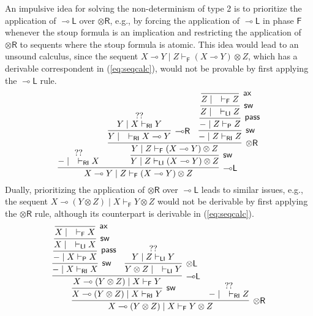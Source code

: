 \documentclass[copyright,creativecommons]{eptcs}
\theoremstyle{definition}
\newcommand{\tl}{\otimes \mathsf{L}}
\newcommand{\tr}{\otimes \mathsf{R}}
\newcommand{\lright}{{\multimap}\mathsf{R}}
\newcommand{\lleft}{{\multimap}\mathsf{L}}
\newcommand{\pass}{\mathsf{pass}}
\newcommand{\ax}{\mathsf{ax}}
\newcommand{\ot}{\otimes}
\newcommand{\lolli}{\multimap}
\newcommand{\RI}{\mathsf{RI}}
\newcommand{\LI}{\mathsf{LI}}
\newcommand{\Pass}{\mathsf{P}}
\newcommand{\F}{\mathsf{F}}
\newcommand{\NMILL}{\texttt{NMILL}}
\newcommand{\SkNMILL}{\NMILL\textsuperscript{\textit{s}}}
\begin{document}
An impulsive idea for solving the non-determinism of type 2 is to prioritize the application of $\lleft$ over $\tr$, e.g., by forcing the application of $\lleft$ in phase $\F$ whenever the stoup formula is an implication and restricting the application of $\tr$ to sequents where the stoup formula is atomic. This idea would lead to an unsound calculus, since the sequent $X \lolli Y \mid Z \vdash_{\F} (X \lolli Y) \ot Z$, which has a derivable correspondent in (\ref{eq:seqcalc}), would not be provable by first applying the $\lleft$ rule.
\begin{equation*}\label{eq:counterexample1}
   \infer[\lleft]{X \lolli Y \mid Z \vdash_{\F} (X \lolli Y) \ot Z}{
     \deduce{{-} \mid \quad \vdash_{\RI} X}{??}
     &
     \infer[\mathsf{sw}]{Y \mid Z \vdash_{\LI} (X \lolli Y) \ot Z}{
       \infer[\tr]{Y \mid Z \vdash_{\F} (X \lolli Y) \ot Z}{
         \infer[\lright]{Y \mid \quad \vdash_{\RI} X \lolli Y}{
           \deduce{Y \mid X \vdash_{\RI} Y}{??}
         }
         &
         \infer[\mathsf{sw}]{{-} \mid Z \vdash_{\RI} Z}{
           \infer[\pass]{{-} \mid Z \vdash_{\Pass} Z}{
             \infer[\mathsf{sw}]{Z \mid \quad \vdash_{\LI} Z}{
               \infer[\ax]{Z \mid \quad \vdash_{\F} Z}{}
             }
           }
         }
       }
     }
   }
\end{equation*}
Dually, prioritizing the application of $\tr$ over $\lleft$ leads to similar issues, e.g., the sequent $X \lolli (Y \ot Z) \mid X \vdash_\F Y \ot Z$ would not be derivable by first applying the $\tr$ rule, although its counterpart is derivable in  (\ref{eq:seqcalc}).
\begin{equation*}\label{eq:counterexample2}
\infer[\tr]{X \lolli (Y \ot Z) \mid X \vdash_{\F} Y \ot Z}{
  \infer[\mathsf{sw}]{X \lolli (Y \ot Z) \mid X \vdash_{\RI} Y}{
    \infer[\lleft]{X \lolli (Y \ot Z) \mid X \vdash_{\F} Y}{
      \infer[\mathsf{sw}]{{-}  \mid X \vdash_{\RI} X}{
        \infer[\pass]{{-}  \mid X \vdash_{\Pass} X}{
          \infer[\mathsf{sw}]{X \mid \quad \vdash_{\LI} X}{
            \infer[\ax]{X \mid \quad \vdash_{\F} X}{}
          }
        }
      }
      &
      \infer[\tl]{Y \ot Z \mid \quad \vdash_{\LI} Y}{
        \deduce{Y \mid Z \vdash_{\LI} Y}{??}
      }
    }
  }
  &
  \deduce{{-}  \mid \quad \vdash_{\RI} Z}{??}
}
\end{equation*}
%
\end{document}
